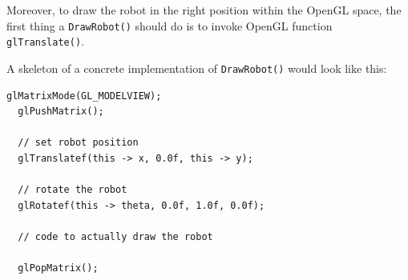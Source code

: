 %
Moreover, to draw the robot in the right position within 
the OpenGL space, the first thing a \texttt{DrawRobot()} should 
do is to invoke OpenGL function \texttt{glTranslate()}.
%

%
A skeleton of a concrete implementation of \texttt{DrawRobot()}
would look like this:
\begin{lstlisting}[caption={\texttt{Robot} class declaration}, label={code:robot_class}, frame=trBL]  
  glMatrixMode(GL_MODELVIEW);
  glPushMatrix();

  // set robot position
  glTranslatef(this -> x, 0.0f, this -> y);

  // rotate the robot 
  glRotatef(this -> theta, 0.0f, 1.0f, 0.0f);

  // code to actually draw the robot

  glPopMatrix();
\end{lstlisting}
%

%

%

